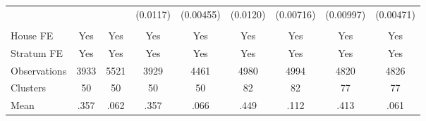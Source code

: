 {\begin{tabular}{l*{8}{c}}
                &         &         & (0.0117)&(0.00455)& (0.0120)&(0.00716)&(0.00997)&(0.00471)\\
                &         &         &         &         &         &         &         &         \\
House FE        &      Yes&      Yes&      Yes&      Yes&      Yes&      Yes&      Yes&      Yes\\
Stratum FE      &      Yes&      Yes&      Yes&      Yes&      Yes&      Yes&      Yes&      Yes\\
\midrule
Observations    &     3933&     5521&     3929&     4461&     4980&     4994&     4820&     4826\\
Clusters        &       50&       50&       50&       50&       82&       82&       77&       77\\
Mean            &     .357&     .062&     .357&     .066&     .449&     .112&     .413&     .061\\
\bottomrule
\end{tabular}
}
